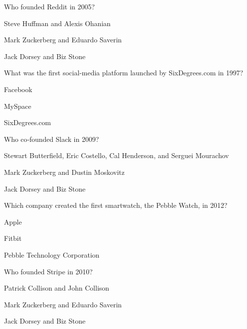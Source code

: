 \begin{enhancedmcq}{Who founded Reddit in 2005?}
\item Steve Huffman and Alexis Ohanian
\item Mark Zuckerberg and Eduardo Saverin
\item Jack Dorsey and Biz Stone

\end{enhancedmcq}
\begin{enhancedmcq}{What was the first social‑media platform launched by SixDegrees.com in 1997?}
\item Facebook
\item MySpace
\item SixDegrees.com

\end{enhancedmcq}
\begin{enhancedmcq}{Who co‑founded Slack in 2009?}
\item Stewart Butterfield, Eric Costello, Cal Henderson, and Serguei Mourachov
\item Mark Zuckerberg and Dustin Moskovitz
\item Jack Dorsey and Biz Stone

\end{enhancedmcq}
\begin{enhancedmcq}{Which company created the first smartwatch, the Pebble Watch, in 2012?}
\item Apple
\item Fitbit
\item Pebble Technology Corporation

\end{enhancedmcq}
\begin{enhancedmcq}{Who founded Stripe in 2010?}
\item Patrick Collison and John Collison
\item Mark Zuckerberg and Eduardo Saverin
\item Jack Dorsey and Biz Stone
\end{enhancedmcq}
